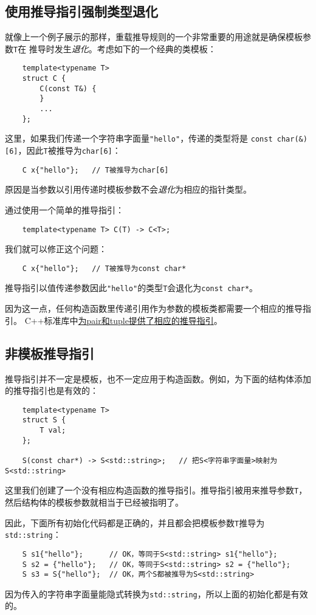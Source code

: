 \subsection{使用推导指引强制类型退化}\label{ch9.2.1}
就像上一个例子展示的那样，重载推导规则的一个非常重要的用途就是确保模板参数\texttt{T}在
推导时发生\emph{退化}。考虑如下的一个经典的类模板：
\begin{lstlisting}
    template<typename T>
    struct C {
        C(const T&) {
        }
        ...
    };
\end{lstlisting}
这里，如果我们传递一个字符串字面量\texttt{"hello"}，传递的类型将是
\texttt{const char(\&)[6]}，因此\texttt{T}被推导为\texttt{char[6]}：
\begin{lstlisting}
    C x{"hello"};   // T被推导为char[6]
\end{lstlisting}
原因是当参数以引用传递时模板参数不会\emph{退化}为相应的指针类型。

通过使用一个简单的推导指引：
\begin{lstlisting}
    template<typename T> C(T) -> C<T>;
\end{lstlisting}
我们就可以修正这个问题：
\begin{lstlisting}
    C x{"hello"};   // T被推导为const char*
\end{lstlisting}
推导指引以值传递参数因此\texttt{"hello"}的类型\texttt{T}会退化为\texttt{const char*}。

因为这一点，任何构造函数里传递引用作为参数的模板类都需要一个相应的推导指引。
C++标准库中\hyperref[ch9.2.6]{为pair和tuple提供了相应的推导指引}。

\subsection{非模板推导指引}
推导指引并不一定是模板，也不一定应用于构造函数。例如，为下面的结构体添加的推导指引也是有效的：
\begin{lstlisting}
    template<typename T>
    struct S {
        T val;
    };

    S(const char*) -> S<std::string>;   // 把S<字符串字面量>映射为S<std::string>
\end{lstlisting}
这里我们创建了一个没有相应构造函数的推导指引。推导指引被用来推导参数\texttt{T}，
然后结构体的模板参数就相当于已经被指明了。

因此，下面所有初始化代码都是正确的，并且都会把模板参数\texttt{T}推导为\texttt{std::string}：
\begin{lstlisting}
    S s1{"hello"};      // OK，等同于S<std::string> s1{"hello"};
    S s2 = {"hello"};   // OK，等同于S<std::string> s2 = {"hello"};
    S s3 = S{"hello"};  // OK，两个S都被推导为S<std::string>
\end{lstlisting}
因为传入的字符串字面量能隐式转换为\texttt{std::string}，所以上面的初始化都是有效的。

